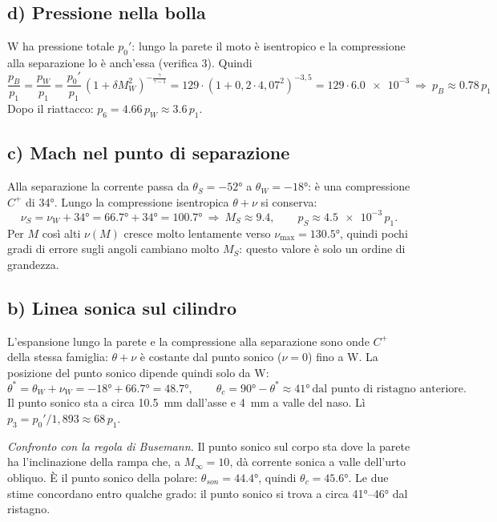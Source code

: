 \documentclass[11pt,a4paper]{article}
\newcommand{\Cp}{C^{+}}
\begin{document}
\subsection*{d) Pressione nella bolla}
W ha pressione totale $p_0'$: lungo la parete il moto è isentropico e la compressione alla separazione lo è
anch'essa (verifica 3). Quindi
\[
\frac{p_B}{p_1}=\frac{p_W}{p_1}=\frac{p_0'}{p_1}\,(1+\delta M_W^2)^{-\frac{\gamma}{\gamma-1}}
=129\cdot(1+0{,}2\cdot4{,}07^2)^{-3{,}5}=129\cdot\num{6.0e-3}
\ \Rightarrow\ \boxed{p_B\approx\num{0.78}\,p_1}
\]
Dopo il riattacco: $p_6=\num{4.66}\,p_W\approx\num{3.6}\,p_1$.

\subsection*{c) Mach nel punto di separazione}
Alla separazione la corrente passa da $\theta_S=-\ang{52}$ a $\theta_W=-\ang{18}$: è una compressione $\Cp$ di
\ang{34}. Lungo la compressione isentropica $\theta+\nu$ si conserva:
\[
\nu_S=\nu_W+\ang{34}=\ang{66.7}+\ang{34}=\ang{100.7}\ \Rightarrow\ \boxed{M_S\approx\num{9.4}},
\qquad p_S\approx\num{4.5e-3}\,p_1.
\]
Per $M$ così alti $\nu(M)$ cresce molto lentamente verso $\nu_{\max}=\ang{130.5}$, quindi pochi gradi di
errore sugli angoli cambiano molto $M_S$: questo valore è solo un ordine di grandezza.

\subsection*{b) Linea sonica sul cilindro}
L'espansione lungo la parete e la compressione alla separazione sono onde $\Cp$ della stessa famiglia: $\theta+\nu$
è costante dal punto sonico ($\nu=0$) fino a W. La posizione del punto sonico dipende quindi solo da W:
\[
\theta^*=\theta_W+\nu_W=-\ang{18}+\ang{66.7}=\ang{48.7},\qquad
\boxed{\theta_c=\ang{90}-\theta^*\approx\ang{41}}\ \text{dal punto di ristagno anteriore}.
\]
Il punto sonico sta a circa \SI{10.5}{mm} dall'asse e \SI{4}{mm} a valle del naso. Lì
$p_3=p_0'/1{,}893\approx\num{68}\,p_1$.

\emph{Confronto con la regola di Busemann.} Il punto sonico sul corpo sta dove la parete ha l'inclinazione della rampa
che, a $M_\infty=10$, dà corrente sonica a valle dell'urto obliquo. È il punto sonico della polare:
$\theta_{son}=\ang{44.4}$, quindi $\theta_c=\ang{45.6}$. Le due stime concordano entro qualche grado:
il punto sonico si trova a circa \ang{41}--\ang{46} dal ristagno.

\end{document}
